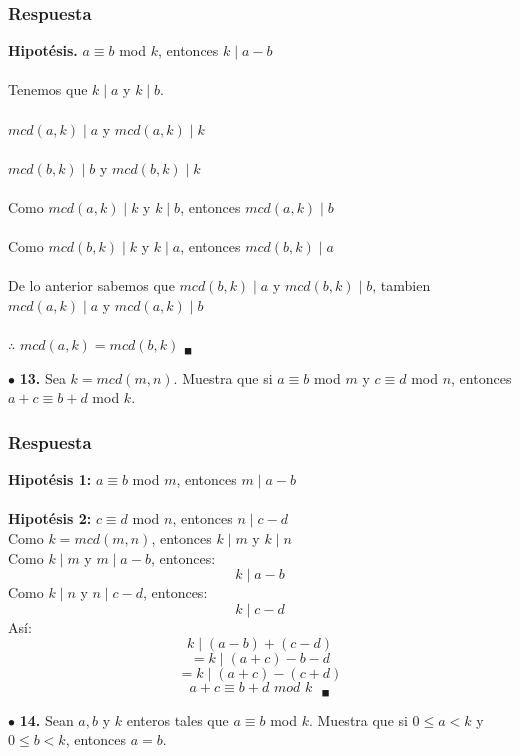 \documentclass[12pt]{article}
\begin{document}
	\subsubsection*{Respuesta}
	\textbf{Hipotésis.} $a \equiv b$ mod $k$, entonces $k \mid a -b$\\
	\\
	Tenemos que $k \mid a$ y $k \mid b$.\\
	\\
	$mcd(a,k) \mid a$ y $mcd(a, k) \mid k$\\
	\\
	$mcd(b,k) \mid b$ y $mcd(b, k) \mid k$\\
	\\
	Como $mcd(a,k) \mid k$ y $k \mid b$, entonces $mcd(a, k) \mid b$\\
	\\
	Como $mcd(b,k) \mid k$ y $k \mid a$, entonces $mcd(b, k) \mid a$\\
	\\
	De lo anterior sabemos que $mcd(b,k) \mid a$ y  $mcd(b,k) \mid b$, tambien $mcd(a,k) \mid a$ y  $mcd(a,k) \mid b$\\
	\\
	$\therefore$ $mcd(a,k) = mcd(b,k)$ $_\blacksquare$
	
	\vspace{1cm}
	$\bullet$ \textbf{13.} Sea $k = mcd(m, n)$. Muestra que si $a \equiv b$ mod $m$ y $c \equiv d$ mod $n$, entonces $a + c \equiv b + d$ mod $k$.
	
	\subsubsection*{Respuesta}
	\textbf{Hipotésis 1:} $a \equiv b$ mod $m$, entonces $m \mid a - b$\\
	\\
	\textbf{Hipotésis 2:} $c \equiv d$ mod $n$, entonces $n \mid c - d$\\
	
	Como $k = mcd(m,n)$, entonces $k \mid m$ y $k \mid n$\\
	
	Como $k \mid m$ y $m \mid a - b$, entonces:
	\[k \mid a - b\]
	Como $k \mid n$ y $n \mid c - d$, entonces:
	\[k \mid c - d\]
	Así:
	\[k \mid (a-b) + (c-d)\]
	\[= k \mid (a+c)-b-d\]
	\[= k \mid (a+c) - (c+d)\]
	\[a+c \equiv b+d \textit{ mod } k \text{ } _\blacksquare\]
	
	\vspace{1cm}
	$\bullet$ \textbf{14.} Sean $a, b$ y $k$ enteros tales que $a \equiv b$ mod $k$. Muestra que si $0 \leq a < k$ y $0 \leq b < k$, entonces $a = b$.
	
\end{document}
